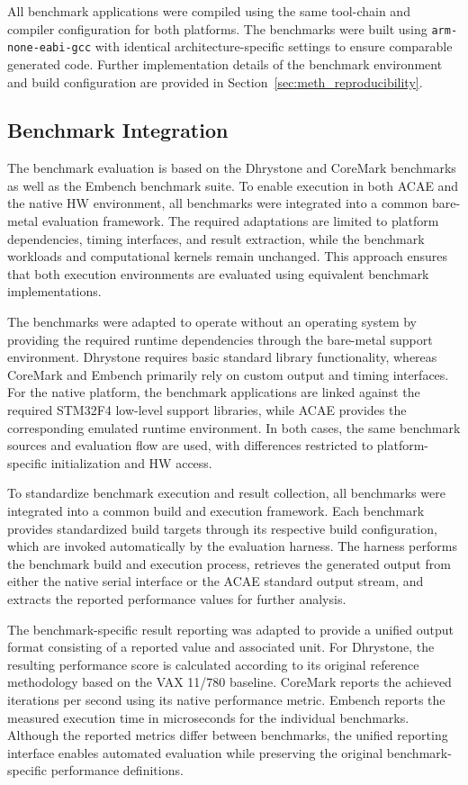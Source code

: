 \documentclass[conference]{IEEEtran}
\begin{document}
			All benchmark applications were compiled using the same tool-chain and compiler configuration for both platforms.
			The benchmarks were built using \texttt{arm-none-eabi-gcc} with identical architecture-specific settings to ensure comparable generated code.
			Further implementation details of the benchmark environment and build configuration are provided in Section~\ref{sec:meth_reproducibility}.

		\subsection{Benchmark Integration}
			\label{sec:meth_benchmark}
			The benchmark evaluation is based on the Dhrystone and CoreMark benchmarks as well as the Embench benchmark suite.
			To enable execution in both \ac{ACAE} and the native \ac{HW} environment, all benchmarks were integrated into a common bare-metal evaluation framework.
			The required adaptations are limited to platform dependencies, timing interfaces, and result extraction, while the benchmark workloads and computational kernels remain unchanged.
			This approach ensures that both execution environments are evaluated using equivalent benchmark implementations.
			
			The benchmarks were adapted to operate without an operating system by providing the required runtime dependencies through the bare-metal support environment.
			Dhrystone requires basic standard library functionality, whereas CoreMark and Embench primarily rely on custom output and timing interfaces.
			For the native platform, the benchmark applications are linked against the required STM32F4 low-level support libraries, while \ac{ACAE} provides the corresponding emulated runtime environment.
			In both cases, the same benchmark sources and evaluation flow are used, with differences restricted to platform-specific initialization and \ac{HW} access.
			
			To standardize benchmark execution and result collection, all benchmarks were integrated into a common build and execution framework.
			Each benchmark provides standardized build targets through its respective build configuration, which are invoked automatically by the evaluation harness.
			The harness performs the benchmark build and execution process, retrieves the generated output from either the native serial interface or the \ac{ACAE} standard output stream, and extracts the reported performance values for further analysis.
			
			The benchmark-specific result reporting was adapted to provide a unified output format consisting of a reported value and associated unit.
			For Dhrystone, the resulting performance score is calculated according to its original reference methodology based on the VAX 11/780 baseline.
			CoreMark reports the achieved iterations per second using its native performance metric.
			Embench reports the measured execution time in microseconds for the individual benchmarks.
			Although the reported metrics differ between benchmarks, the unified reporting interface enables automated evaluation while preserving the original benchmark-specific performance definitions.
					
\end{document}
